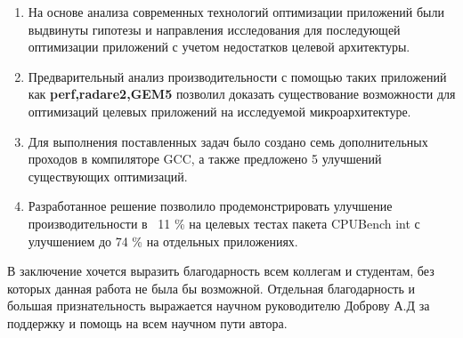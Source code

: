 \begin{enumerate}
	\item На основе анализа современных технологий оптимизации приложений были выдвинуты гипотезы и направления исследования для последующей оптимизации приложений с учетом недостатков целевой архитектуры.
	\item Предварительный анализ производительности с помощью таких приложений как \textbf{perf,radare2,GEM5} позволил доказать существование возможности  для оптимизаций целевых приложений на исследуемой микроархитектуре. 
	\item Для выполнения поставленных задач было создано семь дополнительных проходов в компиляторе GCC, а также предложено 5 улучшений существующих оптимизаций.
	\item Разработанное решение позволило продемонстрировать улучшение производительности в ~11 \% на целевых тестах пакета CPUBench int  с улучшением до 74 \% на отдельных приложениях. 
\end{enumerate}

В заключение хочется выразить благодарность всем коллегам и студентам, без которых данная работа не была бы возможной. Отдельная благодарность и большая признательность выражается научном руководителю Доброву А.Д за поддержку и помощь на всем научном пути автора.

